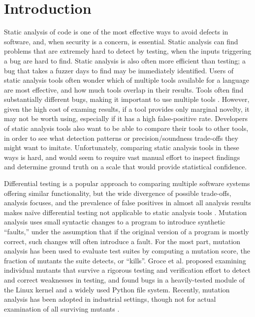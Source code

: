 \section{Introduction}

Static analysis of code is one of the most effective ways to avoid defects in software, and, when security is a concern, is essential.  Static analysis can find problems that are extremely hard to detect by testing, when the inputs triggering a bug are hard to find.  Static analysis is also often more efficient than testing; a bug that takes a fuzzer days to find may be immediately identified.
Users of static analysis tools often wonder which of multiple tools available for a language are most effective, and how much tools overlap in their results.  Tools often find substantially different bugs, making it important to use multiple tools \cite{AllBugs}.  However, given the high cost of examing results, if a tool provides only marginal novelty, it may not be worth using, especially if it has a high false-positive rate.  Developers of static analysis tools also want to be able to compare their tools to other tools, in order to see what detection patterns or precision/soundness trade-offs they might want to imitate.  Unfortunately, comparing static analysis tools in these ways is hard, and would seem to require vast manual effort to inspect findings and determine ground truth on a scale that would provide statistical confidence.

Differential testing \cite{Differential,ICSEDiff,csmith} is a popular approach to comparing multiple software systems offering similar functionality, but the wide divergence of possible trade-offs, analysis focuses, and the prevalence of false positives in almost all analysis results makes na\"ive differential testing not applicable to static analysis tools \cite{regehrRandom}.
Mutation analysis\cite{jia2011analysis,demillo1978hints,budd1980theoretical} uses small syntactic changes to a program to introduce synthetic ``faults,'' under the assumption that if the original version of a program is mostly correct, such changes will often introduce a fault.  For the most part, mutation analysis has been used to evaluate test suites by computing a mutation score, the fraction of mutants the suite detects, or ``kills''.  
Groce et al. \cite{groce2015verified,groce2018verified} proposed examining individual mutants that survive a rigorous testing and verification effort to detect and correct weaknesses in testing, and found bugs in a heavily-tested module of the Linux kernel \cite{mutKernel} and a widely used Python file system.  Recently, mutation analysis has been adopted in industrial settings, though not for actual examination of all surviving mutants \cite{MutGoogle,ivankovic2018industrial}.

